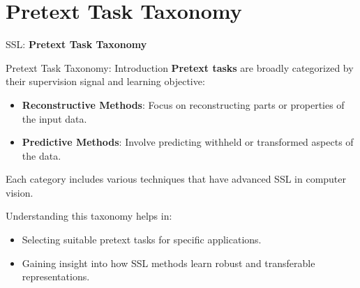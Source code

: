 \section{Pretext Task Taxonomy}
\begin{frame}{}
    \LARGE SSL: \textbf{Pretext Task Taxonomy}
\end{frame}

\begin{frame}[allowframebreaks]{Pretext Task Taxonomy: Introduction}
    \textbf{Pretext tasks} are broadly categorized by their supervision signal and learning objective: 
    \begin{itemize}
        \item \textbf{Reconstructive Methods}: Focus on reconstructing parts or properties of the input data.
        \item \textbf{Predictive Methods}: Involve predicting withheld or transformed aspects of the data.
    \end{itemize}
    
    Each category includes various techniques that have advanced SSL in computer vision.
    
    Understanding this taxonomy helps in:
    \begin{itemize}
        \item Selecting suitable pretext tasks for specific applications.
        \item Gaining insight into how SSL methods learn robust and transferable representations.
    \end{itemize}
\end{frame}

% 
% 
% 
% 
% 
% 
